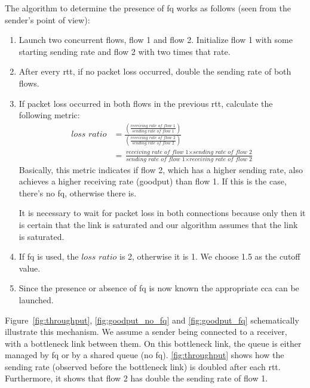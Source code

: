 \documentclass[runningheads]{llncs}
\newcommand{\mynote}[3]{
    \fbox{\bfseries\sffamily\scriptsize#1}
    {\small$\blacktriangleright$\textsf{\emph{\color{#3}{#2}}}$\blacktriangleleft$}}
\newcommand{\noteMax}[1]{\mynote{Max}{#1}{green}}
\begin{document}
The algorithm to determine the presence of \gls{fq} works as follows (seen from the sender's point of view):
\begin{enumerate}
\item Launch two concurrent flows, flow 1 and flow 2. Initialize flow 1 with some starting sending rate and flow 2 with two times that rate. 
\item After every \gls{rtt}, if no packet loss occurred, double the sending rate of both flows. 
\item If packet loss occurred in both flows in the previous \gls{rtt}, calculate the following metric: 
\begin{align}
\textit{loss ratio} &= \frac{\left(\frac{\textit{receiving rate of flow 1}}{\textit{sending rate of flow 1}}\right)}{\left(\frac{\textit{receiving rate of flow 2}}{\textit{sending rate of flow 2}}\right)} \\
&= \frac{\textit{receiving rate of flow 1}\times \textit{sending rate of flow 2}}{\textit{sending rate of flow 1} \times \textit{receiving rate of flow 2}}
\end{align}
Basically, this metric indicates if flow 2, which has a higher sending rate, also achieves a higher receiving rate (goodput) than flow 1. If this is the case, there's no \gls{fq}, otherwise there is. 

It is necessary to wait for packet loss in both connections because only then it is certain that the link is saturated and our algorithm assumes that the link is saturated. 
\item If \gls{fq} is used, the $\textit{loss ratio}$ is 2, otherwise it is 1. We choose 1.5 as the cutoff value. 
\item Since the presence or absence of \gls{fq} is now known the appropriate \gls{cca} can be launched. 
\end{enumerate}

Figure~\ref{fig:throughput}, \ref{fig:goodput_no_fq} and \ref{fig:goodput_fq} schematically illustrate this mechanism. We assume a sender being connected to a receiver, with a bottleneck link between them. On this bottleneck link, the queue is either managed by \gls{fq} or by a shared queue (no \gls{fq}). \autoref{fig:throughput} shows how the sending rate (observed before the bottleneck link) is doubled after each \gls{rtt}. Furthermore, it shows that flow 2 has double the sending rate of flow 1. %
\end{document}
